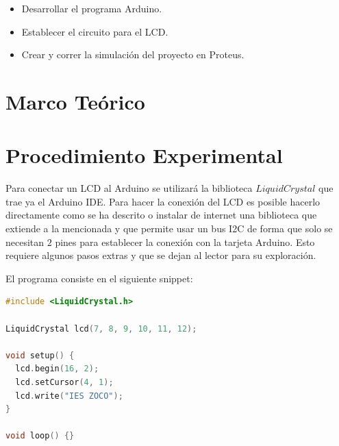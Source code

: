 \documentclass{article}
\begin{document}
    \begin{itemize}
        \item Desarrollar el programa Arduino.
        \item Establecer el circuito para el LCD.
        \item Crear y correr la simulación del proyecto en Proteus.
    \end{itemize}



    \section{Marco Teórico}



    \section{Procedimiento Experimental}

    Para conectar un LCD al Arduino se utilizará la biblioteca $LiquidCrystal$ que trae ya el Arduino IDE. Para hacer la conexión del LCD es posible hacerlo directamente como se ha descrito o instalar de internet una biblioteca que extiende a la mencionada y que permite usar un bus I2C de forma que solo se necesitan $2$ pines para establecer la conexión con la tarjeta Arduino. Esto requiere algunos pasos extras y que se dejan al lector para su exploración.

    \bigbreak

    El programa consiste en el siguiente snippet:

    \begin{lstlisting}[language=C, caption=Arduino Sketch]
#include <LiquidCrystal.h>

LiquidCrystal lcd(7, 8, 9, 10, 11, 12);

void setup() {
  lcd.begin(16, 2);
  lcd.setCursor(4, 1);
  lcd.write("IES ZOCO");
}

void loop() {}
    \end{lstlisting}
\end{document}
